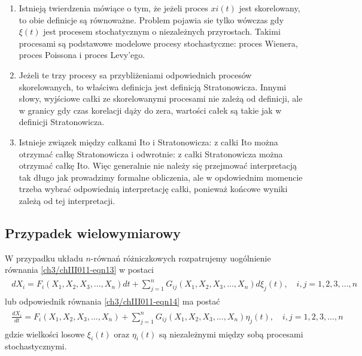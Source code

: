 \documentclass[a4paper,12pt,polish]{sphinxmanual}
\makeatletter
\renewenvironment{notice}[2]{\begin{icsebox}\def\py@noticetype{#1}\par\strong{#2}}{\end{icsebox}}\makeatother
\makeatother
\begin{document}
\begin{notice}{note}{Uwaga:}\begin{enumerate}
\item {} 
Istnieją twierdzenia mówiące o tym, że jeżeli proces $xi(t)$ jest skorelowany, to obie definicje są równoważne. Problem pojawia sie tylko wówczas gdy $\xi(t)$ jest procesem stochatycznym o niezależnych przyrostach. Takimi procesami są podstawowe modelowe procesy stochastyczne: proces Wienera, proces Poissona i proces Levy'ego.

\item {} 
Jeżeli te trzy procesy sa przybliżeniami odpowiednich procesów skorelowanych, to właściwa definicja jest definicją Stratonowicza. Innymi słowy, wyjściowe całki ze skorelowanymi procesami nie zależą od definicji, ale w granicy gdy czas korelacji dąży do zera, wartości całek są takie jak w definicji Stratonowicza.

\item {} 
Istnieje związek między całkami Ito i Stratonowicza: z całki Ito można otrzymać całkę Stratonowicza i odwrotnie: z całki Stratonowicza można otrzymać całkę Ito. Więc generalnie nie należy się przejmować interpretacją tak długo jak prowadzimy formalne obliczenia, ale w opdowiednim momencie trzeba wybrać odpowiednią interpretację całki, ponieważ końcowe wyniki zależą od tej interpretacji.

\end{enumerate}
\end{notice}


\subsection{Przypadek wielowymiarowy}
\label{ch3/chIII011:przypadek-wielowymiarowy}
W przypadku układu $n$-równań różniczkowych rozpatrujemy uogólnienie równania \eqref{ch3/chIII011-eqn13} w postaci
\label{ch3/chIII011:equation-eqn25}\begin{gather}
\begin{split} dX_i = F_i(X_1, X_2, X_3,..., X_n) dt + \sum_{j=1}^{n} G_{ij}(X_1, X_2, X_3,..., X_n) d\xi_j(t), \quad i, j = 1, 2, 3,..., n \qquad\end{split}\label{ch3/chIII011-eqn25}
\end{gather}
lub odpowiednik równania \eqref{ch3/chIII011-eqn14} ma postać
\label{ch3/chIII011:equation-eqn26}\begin{gather}
\begin{split} \frac{dX_i}{dt} = F_i(X_1, X_2, X_3,..., X_n) + \sum_{j=1}^{n} G_{ij}(X_1, X_2, X_3,..., X_n) \eta_{j} (t), \quad i, j = 1, 2, 3,..., n \qquad\end{split}\label{ch3/chIII011-eqn26}
\end{gather}
gdzie wielkości losowe $\xi_i(t)$ oraz $\eta_i(t)$ są niezależnymi między sobą procesami stochastycznymi.
\end{document}
